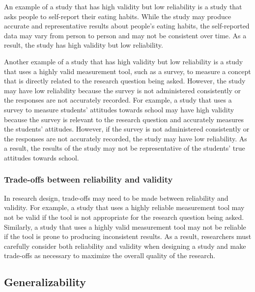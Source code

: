 \documentclass[
  12pt,
  oneside]{book}
\theoremstyle{definition}
\theoremstyle{definition}
\theoremstyle{definition}
\theoremstyle{definition}
\theoremstyle{remark}
\begin{document}
An example of a study that has high validity but low reliability is a study that asks people to self-report their eating habits. While the study may produce accurate and representative results about people's eating habits, the self-reported data may vary from person to person and may not be consistent over time. As a result, the study has high validity but low reliability.

Another example of a study that has high validity but low reliability is a study that uses a highly valid measurement tool, such as a survey, to measure a concept that is directly related to the research question being asked. However, the study may have low reliability because the survey is not administered consistently or the responses are not accurately recorded. For example, a study that uses a survey to measure students' attitudes towards school may have high validity because the survey is relevant to the research question and accurately measures the students' attitudes. However, if the survey is not administered consistently or the responses are not accurately recorded, the study may have low reliability. As a result, the results of the study may not be representative of the students' true attitudes towards school.

\hypertarget{trade-offs-between-reliability-and-validity}{%
\subsubsection*{Trade-offs between reliability and validity}\label{trade-offs-between-reliability-and-validity}}

In research design, trade-offs may need to be made between reliability and validity. For example, a study that uses a highly reliable measurement tool may not be valid if the tool is not appropriate for the research question being asked. Similarly, a study that uses a highly valid measurement tool may not be reliable if the tool is prone to producing inconsistent results. As a result, researchers must carefully consider both reliability and validity when designing a study and make trade-offs as necessary to maximize the overall quality of the research.

\hypertarget{generalizability}{%
\subsection{Generalizability}\label{generalizability}}
\end{document}

